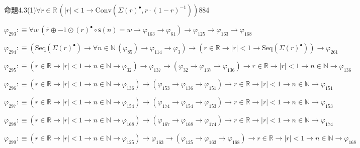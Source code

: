 \begin{fullproof}{命題4.3(1)}{$\forall r \in \mathbb{R}\,(\lvert r \rvert < 1 \to \mathrm{Conv}(\Sigma {(r)^{\bullet}},r \cdot (1 - r)^{-1}))$}{884}
\begin{abbrevlist}
\item $\varphi_{293} :\equiv \forall w\,(\overline{r} \oplus -1 \odot {(r)^{\bullet}} \circ \mathsf{s}(n) = w \to \varphi_{163} \to \varphi_{61}) \to \varphi_{125} \to \varphi_{163} \to \varphi_{168}$
\item $\varphi_{294} :\equiv (\mathrm{Seq}(\Sigma {(r)^{\bullet}}) \to \forall n \in \mathbb{N}\,(\varphi_{85}) \to \varphi_{114} \to \varphi_{3}) \to (r \in \mathbb{R} \to \lvert r \rvert < 1 \to \mathrm{Seq}(\Sigma {(r)^{\bullet}})) \to \varphi_{261}$
\item $\varphi_{295} :\equiv (r \in \mathbb{R} \to \lvert r \rvert < 1 \to n \in \mathbb{N} \to \varphi_{32}) \to \varphi_{137} \to (\varphi_{32} \to \varphi_{137} \to \varphi_{136}) \to r \in \mathbb{R} \to \lvert r \rvert < 1 \to n \in \mathbb{N} \to \varphi_{136}$
\item $\varphi_{296} :\equiv (r \in \mathbb{R} \to \lvert r \rvert < 1 \to n \in \mathbb{N} \to \varphi_{136}) \to (\varphi_{153} \to \varphi_{136} \to \varphi_{151}) \to r \in \mathbb{R} \to \lvert r \rvert < 1 \to n \in \mathbb{N} \to \varphi_{151}$
\item $\varphi_{297} :\equiv (r \in \mathbb{R} \to \lvert r \rvert < 1 \to n \in \mathbb{N} \to \varphi_{154}) \to (\varphi_{174} \to \varphi_{154} \to \varphi_{153}) \to r \in \mathbb{R} \to \lvert r \rvert < 1 \to n \in \mathbb{N} \to \varphi_{153}$
\item $\varphi_{298} :\equiv (r \in \mathbb{R} \to \lvert r \rvert < 1 \to n \in \mathbb{N} \to \varphi_{168}) \to (\varphi_{167} \to \varphi_{168} \to \varphi_{174}) \to r \in \mathbb{R} \to \lvert r \rvert < 1 \to n \in \mathbb{N} \to \varphi_{174}$
\item $\varphi_{299} :\equiv (r \in \mathbb{R} \to \lvert r \rvert < 1 \to n \in \mathbb{N} \to \varphi_{125}) \to \varphi_{163} \to (\varphi_{125} \to \varphi_{163} \to \varphi_{168}) \to r \in \mathbb{R} \to \lvert r \rvert < 1 \to n \in \mathbb{N} \to \varphi_{168}$
\end{abbrevlist}
\end{fullproof}
